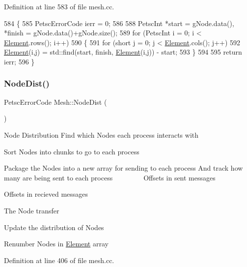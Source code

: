 Definition at line 583 of file mesh.\+cc.


\begin{DoxyCode}
584 \{
585     PetscErrorCode ierr = 0;
586 
588     PetscInt *start = gNode.data(), *finish = gNode.data()+gNode.size();
589     \textcolor{keywordflow}{for} (PetscInt i = 0; i < \mbox{\hyperlink{class_element}{Element}}.rows(); i++)
590     \{
591         \textcolor{keywordflow}{for} (\textcolor{keywordtype}{short} j = 0; j < \mbox{\hyperlink{class_element}{Element}}.cols(); j++)
592             \mbox{\hyperlink{class_element}{Element}}(i,j) = std::find(start, finish, \mbox{\hyperlink{class_element}{Element}}(i,j)) - start;
593     \}
594 
595     \textcolor{keywordflow}{return} ierr;
596 \}
\end{DoxyCode}
\mbox{\label{class_mesh_aa6b19f4fdf210f8937694e8c7d30ea15}} 
\subsubsection{\texorpdfstring{Node\+Dist()}{NodeDist()}}
{\footnotesize\ttfamily Petsc\+Error\+Code Mesh\+::\+Node\+Dist (\begin{DoxyParamCaption}{ }\end{DoxyParamCaption})\hspace{0.3cm}{\ttfamily [protected]}}

Node Distribution Find which Nodes each process interacts with

Sort Nodes into chunks to go to each process

Package the Nodes into a new array for sending to each process And track how many are being sent to each process ~\newline
~\newline
~\newline
~\newline
~\newline
 Offsets in sent messages

Offsets in recieved messages

The Node transfer

Update the distribution of Nodes

Renumber Nodes in \mbox{\hyperlink{class_element}{Element}} array 

Definition at line 406 of file mesh.\+cc.



